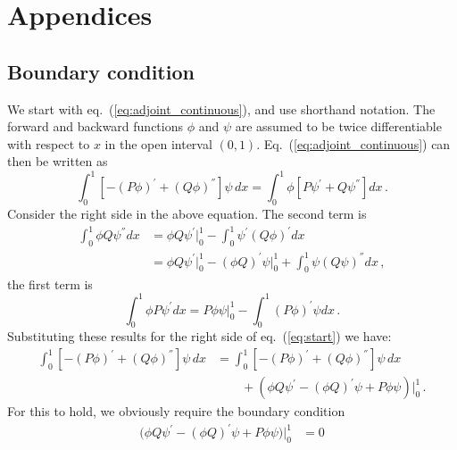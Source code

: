 \documentclass[preprint]{elsarticle}
\begin{document}
\section{Appendices}

\subsection{Boundary condition}\label{section:is_adjoint?}

We start with eq.~(\ref{eq:adjoint_continuous}), and use shorthand notation. The forward and backward functions $\phi$ and $\psi$ are assumed to be twice differentiable with respect to $x$ in the open interval $(0,1)$. Eq.~(\ref{eq:adjoint_continuous}) can then be written as
\begin{equation}\label{eq:start}
\int_0^1  \left[-(P\phi)^{'}+(Q\phi)^{''}\right] \psi\, dx=
\int_0^1  \phi \left[P\psi^{'}+Q\psi^{''}\right] dx\,.
\end{equation}
Consider the right side in the above equation. The second term is
\begin{equation}
\begin{split}
\int_0^1  \phi Q\psi^{''} dx&=
\phi Q\psi^{'}\big|_0^1-\int_0^1  \psi^{'}(Q\phi)^{'} dx\\
&=\phi Q\psi^{'}\big|_0^1-(\phi Q)^{'}\psi\big|_0^1+\int_0^1  \psi(Q\psi)^{''} dx\,,
\end{split}
\end{equation}
the first term is 
\begin{equation}
\int_0^1  \phi P\psi^{'} dx= P\phi\psi\big|_0^1 -\int_0^1  (P\phi)^{'}\psi dx\,.
\end{equation}
Substituting these results for the right side of eq.~(\ref{eq:start}) we have:
\begin{equation}\label{eq:adjoint_shorthand}
\begin{split}
\int_0^1  \left[-(P\phi)^{'}+(Q\phi)^{''}\right] \psi\, dx&=
\int_0^1  \left[-(P\phi)^{'}+(Q\phi)^{''}\right]\psi\,dx\\
&\qquad+(\phi Q\psi^{'}-(\phi Q)^{'}\psi+P\phi\psi)\big|_0^1\,.
\end{split}
\end{equation}
For this to hold, we obviously require the boundary condition
\begin{equation}\label{eq:bound_cond_1}
\begin{split}
\big(\phi Q\psi^{'}-(\phi Q)^{'}\psi+P\phi\psi\big)\big|_0^1&=0
\end{split}
\end{equation}
\end{document}
